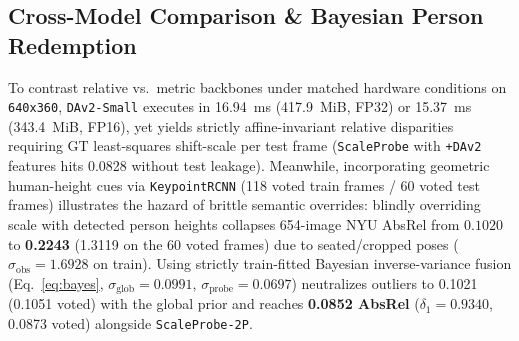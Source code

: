 \documentclass[10pt,twocolumn,letterpaper]{article}
\begin{document}
\subsection{Cross-Model Comparison \& Bayesian Person Redemption}
To contrast relative vs.\ metric backbones under matched hardware conditions on \texttt{640x360}, \texttt{DAv2-Small} executes in 16.94~ms (417.9~MiB, FP32) or 15.37~ms (343.4~MiB, FP16), yet yields strictly affine-invariant relative disparities requiring GT least-squares shift-scale per test frame (\texttt{ScaleProbe} with \texttt{+DAv2} features hits 0.0828 without test leakage). Meanwhile, incorporating geometric human-height cues via \texttt{KeypointRCNN} (118 voted train frames / 60 voted test frames) illustrates the hazard of brittle semantic overrides: blindly overriding scale with detected person heights collapses 654-image NYU AbsRel from $0.1020$ to \textbf{0.2243} (1.3119 on the 60 voted frames) due to seated/cropped poses ($\sigma_{\text{obs}}=1.6928$ on train). Using strictly train-fitted Bayesian inverse-variance fusion (Eq.~\ref{eq:bayes}, $\sigma_{\text{glob}}=0.0991$, $\sigma_{\text{probe}}=0.0697$) neutralizes outliers to 0.1021 (0.1051 voted) with the global prior and reaches \textbf{0.0852 AbsRel} ($\delta_1=0.9340$, 0.0873 voted) alongside \texttt{ScaleProbe-2P}.
\end{document}
